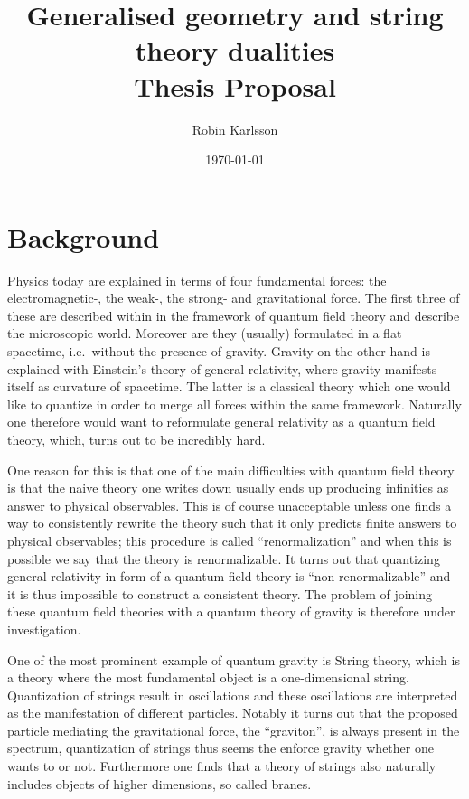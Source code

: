 \documentclass{article}
\title{Generalised geometry and string theory dualities\\
\Large{Thesis Proposal}}
\author{Robin Karlsson}
\date{\today}
\begin{document}
\maketitle

\section*{Background}
Physics today are explained in terms of four fundamental forces: the electromagnetic-, the weak-, the strong- and gravitational force. The first three of these are described within in the framework of quantum field theory and describe the microscopic world. Moreover are they (usually) formulated in a flat spacetime, i.e.\ without the presence of gravity. Gravity on the other hand is explained with Einstein's theory of general relativity, where gravity manifests itself as curvature of spacetime. The latter is a classical theory which one would like to quantize in order to merge all forces within the same framework. Naturally one therefore would want to reformulate general relativity as a quantum field theory, which, turns out to be incredibly hard. 

One reason for this is that one of the main difficulties with quantum field theory is that the naive theory one writes down usually ends up producing infinities as answer to physical observables. This is of course unacceptable unless one finds a way to consistently rewrite the theory such that it only predicts finite answers to physical observables; this procedure is called ``renormalization'' and when this is possible we say that the theory is renormalizable. It turns out that quantizing general relativity in form of a quantum field theory is ``non-renormalizable'' and it is thus impossible to construct a consistent theory. The problem of joining these quantum field theories with a quantum theory of gravity is therefore under investigation. 

One of the most prominent example of quantum gravity is String theory, which is a theory where the most fundamental object is a one-dimensional string. Quantization of strings result in oscillations and these oscillations are interpreted as the manifestation of different particles. Notably it turns out that the proposed particle mediating the gravitational force, the ``graviton'', is always present in the spectrum, quantization of strings thus seems the enforce gravity whether one wants to or not. Furthermore one finds that a theory of strings also naturally includes objects of higher dimensions, so called branes. 
\end{document}
